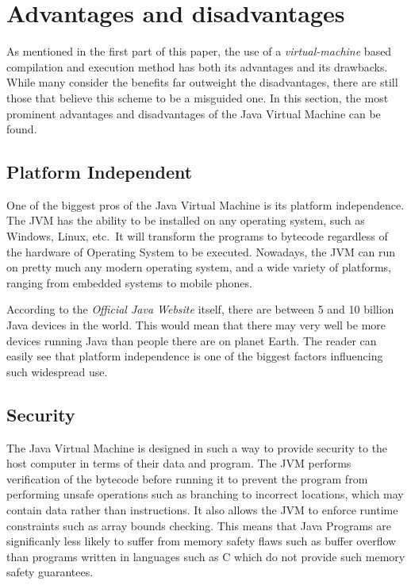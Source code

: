 \documentclass[english,runningheads,a4paper]{llncs}[2018/03/10]
\begin{document}
\section*{Advantages and disadvantages}
As mentioned in the first part of this paper, the use of a
\textit{virtual-machine} based compilation and execution method has both its
advantages and its drawbacks. While many consider the benefits far outweight the
disadvantages, there are still those that believe this scheme to be a misguided one.
In this section, the most prominent advantages and disadvantages of the Java
Virtual Machine can be found. \parencite{jvmspec}

\subsection*{Platform Independent}
One of the biggest pros of the Java Virtual Machine is its platform
independence. The JVM has the ability to be installed on any operating system,
such as Windows, Linux, etc.\ It will transform the programs to bytecode
regardless of the hardware of Operating System to be executed. Nowadays, the JVM
can run on pretty much any modern operating system, and a wide variety of
platforms, ranging from embedded systems to mobile phones.

According to the \textit{Official Java Website} \parencite{gojava} itself, there are between 5 and
10 billion Java devices in the world. This would mean that there may very well
be more devices running Java than people there are on planet Earth. The reader
can easily see that platform independence is one of the biggest factors
influencing such widespread use.

\subsection*{Security}
The Java Virtual Machine is designed in such a way to provide security to the
host computer in terms of their data and program. The JVM performs verification
of the bytecode before running it to prevent the program from performing unsafe
operations such as branching to incorrect locations, which may contain data
rather than instructions. It also allows the JVM to enforce runtime constraints
such as array bounds checking. This means that Java Programs are significanly
less likely to suffer from memory safety flaws such as buffer overflow than
programs written in languages such as C which do not provide such memory safety
guarantees.
\end{document}
